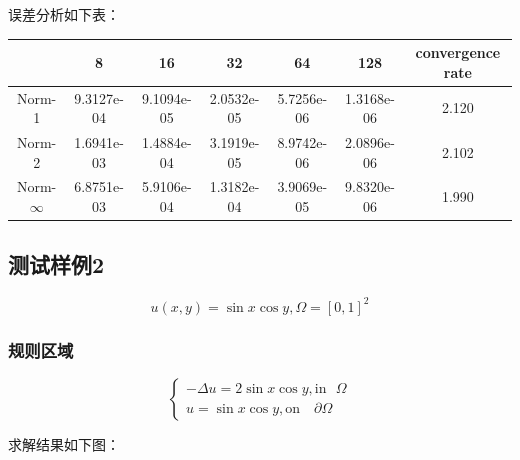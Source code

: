 \documentclass[lang=cn,a4paper,newtx,bibend=bibtex]{elegantpaper}
\begin{document}
误差分析如下表：

\begin{table}[H]
  \centering
  \begin{tabular}{|c|c|c|c|c|c|c|}
  \hline
   & 8 & 16 & 32 & 64 & 128 & convergence rate \\
  \hline
  Norm-1 & 9.3127e-04 & 9.1094e-05 & 2.0532e-05 & 5.7256e-06 & 1.3168e-06 & 2.120 \\
  Norm-2 & 1.6941e-03 & 1.4884e-04 & 3.1919e-05 & 8.9742e-06 & 2.0896e-06 & 2.102 \\
  Norm-$\infty$ & 6.8751e-03 & 5.9106e-04 & 1.3182e-04 & 3.9069e-05 & 9.8320e-06 & 1.990 \\
  \hline
  \end{tabular}
  \end{table}

\subsection{测试样例2}

\[
  u(x, y) = \sin x \cos y, \Omega = [0, 1]^2
\]


\subsubsection{规则区域}


\[
\begin{cases}
  - \Delta u = 2\sin x \cos y, \text{in~~} \Omega \\
  u = \sin x \cos y, \text{on ~~} \partial \Omega
\end{cases}
\]

求解结果如下图：
\end{document}
